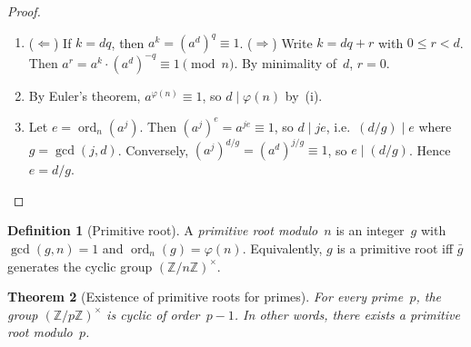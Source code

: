 \documentclass[12pt,a4paper,openany]{book}
\theoremstyle{definition}
\newtheorem{definition}{Definition}[chapter]
\theoremstyle{plain}
\newtheorem{theorem}[definition]{Theorem}
\theoremstyle{remark}
\newcommand{\Z}{\mathbb{Z}}
\DeclareMathOperator{\ord}{ord}
\begin{document}
\begin{proof}
\leavevmode
\begin{enumerate}[label=(\roman*)]
  \item ($\Leftarrow$) If $k = dq$, then $a^k = (a^d)^q \equiv 1$.
        ($\Rightarrow$) Write $k = dq + r$ with $0 \le r < d$.  Then
        $a^r = a^k \cdot (a^d)^{-q} \equiv 1 \pmod{n}$.
        By minimality of~$d$, $r = 0$.
  \item By Euler's theorem, $a^{\varphi(n)} \equiv 1$, so $d \mid \varphi(n)$
        by~(i).
  \item Let $e = \ord_n(a^j)$.  Then $(a^j)^e = a^{je} \equiv 1$, so
        $d \mid je$, i.e.\ $(d/g) \mid e$ where $g = \gcd(j,d)$.
        Conversely, $(a^j)^{d/g} = (a^d)^{j/g} \equiv 1$, so $e \mid (d/g)$.
        Hence $e = d/g$.
        \qedhere
\end{enumerate}
\end{proof}

\begin{definition}[Primitive root]
\label{def:primitive-root}
A \emph{primitive root modulo~$n$} is an integer~$g$ with $\gcd(g,n)=1$
and $\ord_n(g) = \varphi(n)$.  Equivalently, $g$ is a primitive root
iff $\bar{g}$ generates the cyclic group $(\Z/n\Z)^\times$.
\end{definition}

\begin{theorem}[Existence of primitive roots for primes]
\label{thm:primitive-root-prime}
For every prime~$p$, the group $(\Z/p\Z)^\times$ is cyclic of order~$p-1$.
In other words, there exists a primitive root modulo~$p$.
\end{theorem}
\end{document}
